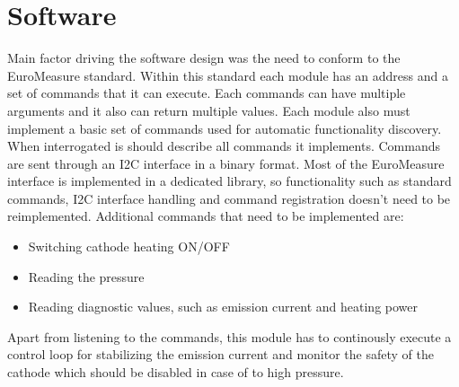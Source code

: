 \documentclass{article}
\begin{document}
\section{Software}
Main factor driving the software design was the need to conform to the EuroMeasure standard. Within this standard each module has an address and a set of commands that it can execute.
Each commands can have multiple arguments and it also can return multiple values. Each module also must implement a basic set of commands used for automatic functionality discovery. When interrogated is should describe all commands it implements.
Commands are sent through an I2C interface in a binary format. Most of the EuroMeasure interface is implemented in a dedicated library, so functionality such as standard commands, I2C interface handling and command registration doesn't need to be reimplemented.
Additional commands that need to be implemented are:
\begin{itemize}
	\item Switching cathode heating ON/OFF
	\item Reading the pressure
	\item Reading diagnostic values, such as emission current and heating power
\end{itemize}
Apart from listening to the commands, this module has to continously execute a control loop for stabilizing the emission current and monitor the safety of the cathode which should be disabled in case of to high pressure.
\end{document}
